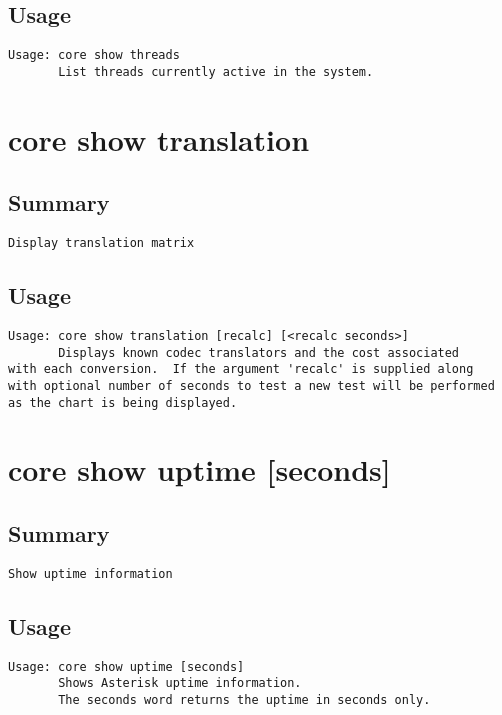 \subsection{Usage}
\begin{verbatim}
Usage: core show threads
       List threads currently active in the system.

\end{verbatim}


\section{core show translation}
\subsection{Summary}
\begin{verbatim}
Display translation matrix
\end{verbatim}
\subsection{Usage}
\begin{verbatim}
Usage: core show translation [recalc] [<recalc seconds>]
       Displays known codec translators and the cost associated
with each conversion.  If the argument 'recalc' is supplied along
with optional number of seconds to test a new test will be performed
as the chart is being displayed.

\end{verbatim}


\section{core show uptime [seconds]}
\subsection{Summary}
\begin{verbatim}
Show uptime information
\end{verbatim}
\subsection{Usage}
\begin{verbatim}
Usage: core show uptime [seconds]
       Shows Asterisk uptime information.
       The seconds word returns the uptime in seconds only.

\end{verbatim}


